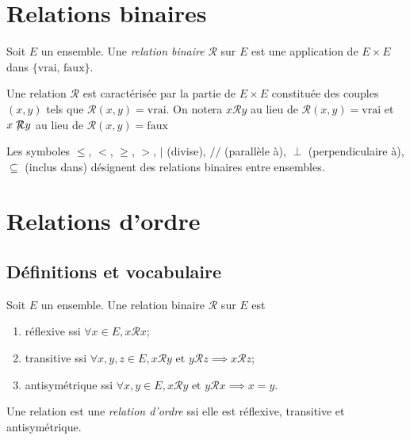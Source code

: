 \section{Relations binaires}

\begin{definition} Soit $E$ un ensemble. Une \emph{relation binaire} ${\mathcal R}$ sur $E$ est une application de $E\times E$ dans $\{\text{vrai, faux}\}$.
\end{definition}

Une relation ${\mathcal R}$ est caractérisée par la partie de $E\times E$ constituée des couples $(x,y)$ tels que ${\mathcal R}(x,y)=\text{vrai}$. On notera \og$x{\mathcal R}y$\fg{} au lieu de \og${\mathcal R}(x,y)=\text{vrai}$\fg{} et \og$x\not \hspace{-.1cm}{\mathcal R} y$\fg{} au lieu de \og${\mathcal R}(x,y)=\text{faux}$\fg{}

\begin{exemples} Les symboles $\leq$, $<$, $\geq$, $>$, $|$ (divise), $//$ (parallèle à), $\perp$ (perpendiculaire à), $\subseteq$ (inclus dans) désignent des relations binaires entre ensembles.
\end{exemples}

\section{Relations d'ordre}

\subsection{Définitions et vocabulaire}

\begin{definition}
Soit $E$ un ensemble. Une relation binaire ${\mathcal R}$ sur $E$ est
\begin{enumerate}
\item réflexive ssi $\forall x\in E, x{\mathcal R}x$;
\item transitive ssi $\forall x, y, z\in E, x\mathcal Ry \text{ et } y{\mathcal R}z \implies x{\mathcal R}z$;
\item antisymétrique ssi $\forall x, y \in E, x{\mathcal R}y\text{ et } y{\mathcal R}x \implies x=y$.
\end{enumerate}

Une relation est une \emph{relation d'ordre} ssi elle est réflexive, transitive et antisymétrique.
\end{definition}

